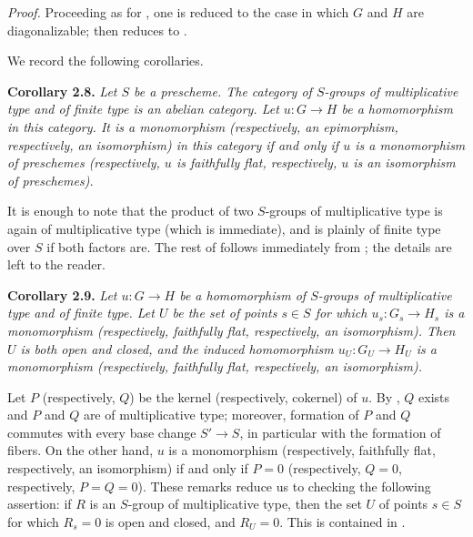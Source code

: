 \emph{Proof.}
Proceeding as for , one is
reduced to the case in which \(G\) and \(H\) are diagonalizable; then
 reduces to .

We record the following corollaries.

\medskip
\noindent{}\textbf{Corollary 2.8.}
\textit{Let \(S\) be a prescheme. The category of \(S\)-groups of
multiplicative type and of finite type is an abelian category. Let
\(u:G\to H\) be a homomorphism in this category. It is a monomorphism
(respectively, an epimorphism, respectively, an isomorphism) in this
category if and only if \(u\) is a monomorphism of preschemes
(respectively, \(u\) is faithfully flat, respectively, \(u\) is an
isomorphism of preschemes).}

It is enough to note that the product of two \(S\)-groups of
multiplicative type is again of multiplicative type (which is immediate),
and is plainly of finite type over \(S\) if both factors are. The rest of
 follows immediately from
; the details are left to the
reader.

\medskip
\noindent{}\textbf{Corollary 2.9.}
\textit{Let \(u:G\to H\) be a homomorphism of \(S\)-groups of
multiplicative type and of finite type. Let \(U\) be the set of points
\(s\in S\) for which \(u_s:G_s\to H_s\) is a monomorphism
(respectively, faithfully flat, respectively, an isomorphism). Then
\(U\) is both open and closed, and the induced homomorphism
\(u_U:G_U\to H_U\) is a monomorphism (respectively, faithfully flat,
respectively, an isomorphism).}

Let \(P\) (respectively, \(Q\)) be the kernel (respectively, cokernel) of
\(u\). By , \(Q\) exists and
\(P\) and \(Q\) are of multiplicative type; moreover, formation of \(P\)
and \(Q\) commutes with every base change \(S'\to S\), in particular with
the formation of fibers. On the other hand, \(u\) is a monomorphism
(respectively, faithfully flat, respectively, an isomorphism) if and only
if \(P=0\) (respectively, \(Q=0\), respectively, \(P=Q=0\)). These
remarks reduce us to checking the following assertion: if \(R\) is an
\(S\)-group of multiplicative type, then the set \(U\) of points
\(s\in S\) for which \(R_s=0\) is open and closed, and \(R_U=0\). This is
contained in .

